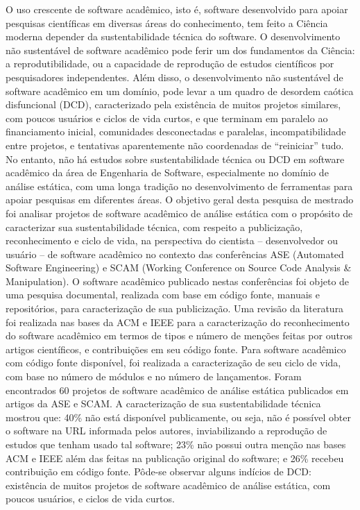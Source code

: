 O uso crescente de software acadêmico, isto é, software desenvolvido para
apoiar pesquisas científicas em diversas áreas do conhecimento, tem feito
a Ciência moderna depender da sustentabilidade técnica do software.
%
O desenvolvimento não sustentável de software acadêmico pode ferir um dos
fundamentos da Ciência: a reprodutibilidade, ou a capacidade de reprodução de
estudos científicos por pesquisadores independentes.
%
Além disso, o desenvolvimento não sustentável de software acadêmico em um
domínio, pode levar a um quadro de desordem caótica disfuncional (DCD),
caracterizado pela existência de muitos projetos similares, com poucos usuários
e ciclos de vida curtos, e que terminam em paralelo ao financiamento inicial,
comunidades desconectadas e paralelas, incompatibilidade entre projetos, e
tentativas aparentemente não coordenadas de ``reiniciar'' tudo.
%
No entanto, não há %
estudos sobre sustentabilidade técnica ou DCD em software acadêmico da
área de Engenharia de Software, especialmente no domínio de análise estática,
com uma longa tradição no desenvolvimento de ferramentas para apoiar pesquisas
em diferentes áreas.
%
O objetivo geral desta pesquisa de mestrado foi analisar projetos de
software acadêmico de análise estática 
com o propósito de caracterizar sua sustentabilidade técnica, 
com respeito a publicização, reconhecimento e ciclo de vida, 
na perspectiva do cientista -- desenvolvedor ou usuário -- de software
acadêmico no contexto das conferências 
ASE (Automated Software Engineering) e SCAM (Working Conference on Source Code
Analysis \& Manipulation).
%
O software acadêmico publicado nestas conferências 
foi objeto de uma pesquisa documental, realizada com base em código fonte, 
manuais e repositórios, para caracterização de sua publicização.
%
Uma revisão da literatura foi realizada nas bases da ACM e IEEE
para a caracterização do reconhecimento do software acadêmico
em termos de tipos e número de menções feitas por outros artigos científicos, e
contribuições em seu código fonte.
%
Para software acadêmico com código fonte disponível, 
foi realizada a caracterização de seu ciclo de vida,
com base no número de módulos e no número de lançamentos.
%
Foram encontrados 60 projetos de software acadêmico de análise estática
publicados em artigos da ASE e SCAM.
%
A caracterização de sua sustentabilidade técnica mostrou que: 
40\% não está disponível publicamente, ou seja, não é possível obter 
o software na URL informada pelos autores, inviabilizando 
a reprodução de estudos que tenham usado tal software;
%
23\% não possui outra menção nas bases ACM e IEEE além das feitas na publicação original
do software; e 26\% recebeu contribuição em código fonte.
%
Pôde-se observar alguns indícios de DCD: 
existência de muitos projetos de software acadêmico de análise estática, %
com poucos usuários, e ciclos de vida curtos.
